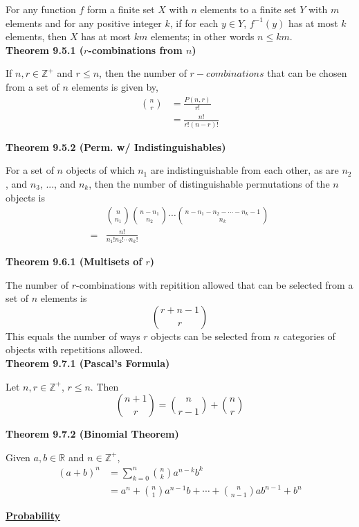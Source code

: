 \documentclass[a4paper]{article}
\newcommand{\heading}[1]{{\small\underline{\textbf{#1}}}}
\newcommand{\subheading}[1]{{\scriptsize\textbf{#1}}}
\begin{document}
\begin{multicols*}{4}
For any function $f$ form a finite set $X$ with $n$ elements to a finite set $Y$
with $m$ elements and for any positive integer $k$, if for each $y \in Y$,
$f^{-1}(y)$ has at most $k$ elements, then $X$ has at most $km$ elements; in
other words $n \leq km$.\\

\subheading{Theorem 9.5.1 ($r$-combinations from $n$)}

If $n, r \in \mathbb{Z}^+$ and $r \leq n$, then the number of $r-combinations$
that can be chosen from a set of $n$ elements is given by,
\begin{align*}
  \binom{n}{r} &= \frac{P(n, r)}{r!} \\
    &= \frac{n!}{r!(n-r)!}
\end{align*}

\subheading{Theorem 9.5.2 (Perm. w/ Indistinguishables)}

For a set of $n$ objects of which $n_1$ are indistinguishable from each other,
as are $n_2$, and $n_3$, ..., and $n_k$, then the number of distinguishable
permutations of the $n$ objects is
\begin{align*}
  &\binom{n}{n_1} \binom{n-n_1}{n_2} \cdots \binom{n-n_1-n_2- \cdots - n_k-1}{n_k} \\
  = &\frac{n!}{n_1!n_2!\cdots n_k!}
\end{align*}

\subheading{Theorem 9.6.1 (Multisets of $r$)}

The number of $r$-combinations with repitition allowed that can be selected from
a set of $n$ elements is $$\binom{r+n-1}{r}$$
This equals the number of ways $r$ objects can be selected from $n$ categories
of objects with repetitions allowed.\\

\subheading{Theorem 9.7.1 (Pascal's Formula)}

Let $n, r \in \mathbb{Z}^+$, $r \leq n$. Then
$$\binom{n+1}{r} = \binom{n}{r-1} + \binom{n}{r}$$

\subheading{Theorem 9.7.2 (Binomial Theorem)}

Given $a, b \in \mathbb{R}$ and $n \in \mathbb{Z}^+$,
\begin{align*}
  (a + b)^n &= \sum^n_{k=0} \binom{n}{k} a^{n-k}b^k \\
    &= a^n + \binom{n}{1}a^{n-1}b + \cdots + \binom{n}{n-1}ab^{n-1} + b^n
\end{align*}

\heading{Probability}\\


\end{multicols*}
\end{document}
